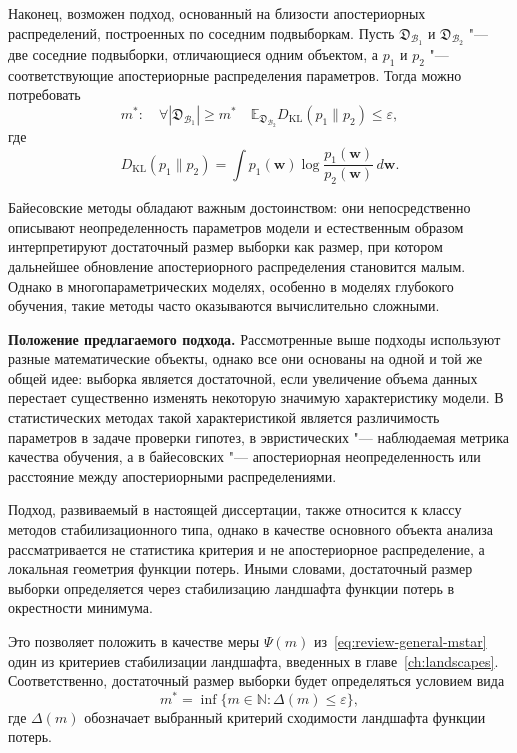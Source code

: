 Наконец, возможен подход, основанный на близости апостериорных распределений, построенных по соседним подвыборкам. Пусть $\mathfrak D_{\mathcal B_1}$ и $\mathfrak D_{\mathcal B_2}$ "--- две соседние подвыборки, отличающиеся одним объектом, а $p_1$ и $p_2$ "--- соответствующие апостериорные распределения параметров. Тогда можно потребовать
\begin{equation}
    \label{eq:review-bayes-kl}
    m^*:\quad
    \forall |\mathfrak D_{\mathcal B_1}|\ge m^*
    \quad
    \mathbb E_{\mathfrak D_{\mathcal B_2}}
    D_{\mathrm{KL}}(p_1 \| p_2)
    \le \varepsilon,
\end{equation}
где
\begin{equation}
    \label{eq:review-kl}
    D_{\mathrm{KL}}(p_1 \| p_2)
    =
    \int
    p_1(\mathbf w)
    \log\frac{p_1(\mathbf w)}{p_2(\mathbf w)}
    \,d\mathbf w.
\end{equation}

Байесовские методы обладают важным достоинством: они непосредственно описывают неопределенность параметров модели и естественным образом интерпретируют достаточный размер выборки как размер, при котором дальнейшее обновление апостериорного распределения становится малым. Однако в многопараметрических моделях, особенно в моделях глубокого обучения, такие методы часто оказываются вычислительно сложными.

\textbf{Положение предлагаемого подхода.} Рассмотренные выше подходы используют разные математические объекты, однако все они основаны на одной и той же общей идее: выборка является достаточной, если увеличение объема данных перестает существенно изменять некоторую значимую характеристику модели. В статистических методах такой характеристикой является различимость параметров в задаче проверки гипотез, в эвристических "--- наблюдаемая метрика качества обучения, а в байесовских "--- апостериорная неопределенность или расстояние между апостериорными распределениями.

Подход, развиваемый в настоящей диссертации, также относится к классу методов стабилизационного типа, однако в качестве основного объекта анализа рассматривается не статистика критерия и не апостериорное распределение, а локальная геометрия функции потерь. Иными словами, достаточный размер выборки определяется через стабилизацию ландшафта функции потерь в окрестности минимума.

Это позволяет положить в качестве меры $\Psi(m)$ из~\eqref{eq:review-general-mstar} один из критериев стабилизации ландшафта, введенных в главе~\ref{ch:landscapes}. Соответственно, достаточный размер выборки будет определяться условием вида
\begin{equation}
    \label{eq:review-our-general}
    m^*=\inf\{m\in\mathbb N:\Delta(m)\le \varepsilon\},
\end{equation}
где $\Delta(m)$ обозначает выбранный критерий сходимости ландшафта функции потерь.

